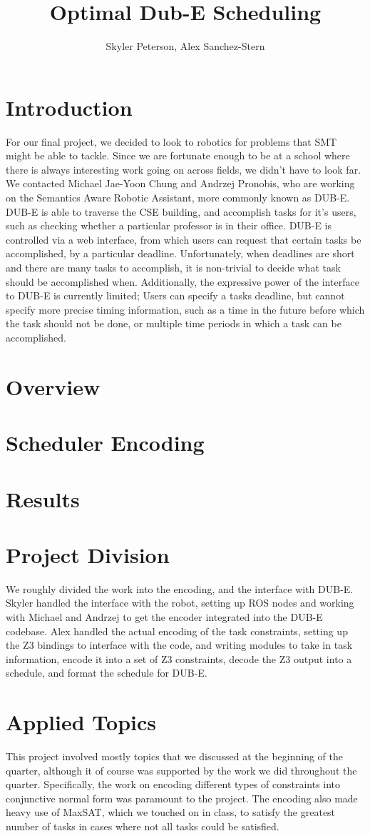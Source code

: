 \documentclass{article}
\title{Optimal Dub-E Scheduling}
\author{Skyler Peterson, Alex Sanchez-Stern}
\begin{document}
\maketitle
\section{Introduction}
For our final project,
we decided to look to robotics
for problems that SMT might be able to tackle.
Since we are fortunate enough to be at a school
where there is always interesting work going on across fields,
we didn't have to look far.
We contacted Michael Jae-Yoon Chung and Andrzej Pronobis,
who are working on the Semantics Aware Robotic Assistant,
more commonly known as DUB-E.
DUB-E is able to traverse the CSE building,
and accomplish tasks for it's users,
such as checking whether a particular professor is in their office.
DUB-E is controlled via a web interface,
from which users can request that certain tasks be accomplished,
by a particular deadline.
Unfortunately, when deadlines are short
and there are many tasks to accomplish,
it is non-trivial to decide what task
should be accomplished when.
Additionally, the expressive power of the interface to DUB-E
is currently limited;
Users can specify a tasks deadline,
but cannot specify more precise timing information,
such as a time in the future
before which the task should not be done,
or multiple time periods in which a task can be accomplished.
\section{Overview}
\section{Scheduler Encoding}
\section{Results}
\section{Project Division}
We roughly divided the work into the encoding,
and the interface with DUB-E.
Skyler handled the interface with the robot,
setting up ROS nodes and working with Michael and Andrzej
to get the encoder integrated
into the DUB-E codebase.
Alex handled the actual encoding of the task constraints,
setting up the Z3 bindings to interface with the code,
and writing modules to take in task information,
encode it into a set of Z3 constraints,
decode the Z3 output into a schedule,
and format the schedule for DUB-E.
\section{Applied Topics}
This project involved mostly topics
that we discussed at the beginning of the quarter,
although it of course was supported by
the work we did throughout the quarter.
Specifically, the work on encoding different types of constraints
into conjunctive normal form was paramount to the project.
The encoding also made heavy use of MaxSAT,
which we touched on in class,
to satisfy the greatest number of tasks
in cases where not all tasks could be satisfied.
\end{document}
